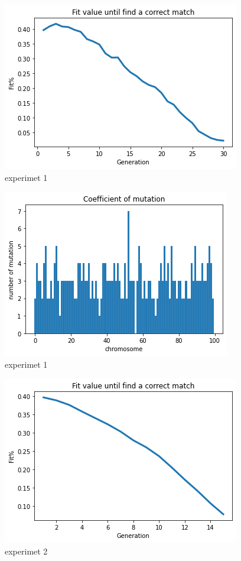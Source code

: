 \documentclass[letterpaper]{article} %
\begin{document}
\begin{figure}[h]
\centering
    \includegraphics[scale = 0.5]{fitpop100.png}
    \caption{experimet 1}
\end{figure}
\begin{figure}[h]
 \centering
 \includegraphics[scale = 0.5]{histpop100.png}
    \caption{experimet 1}
\end{figure}
\begin{figure}[h]
\centering
    \includegraphics[scale = 0.5]{fitpop1000.png}
    \caption{experimet 2}
\end{figure}
\end{document}
